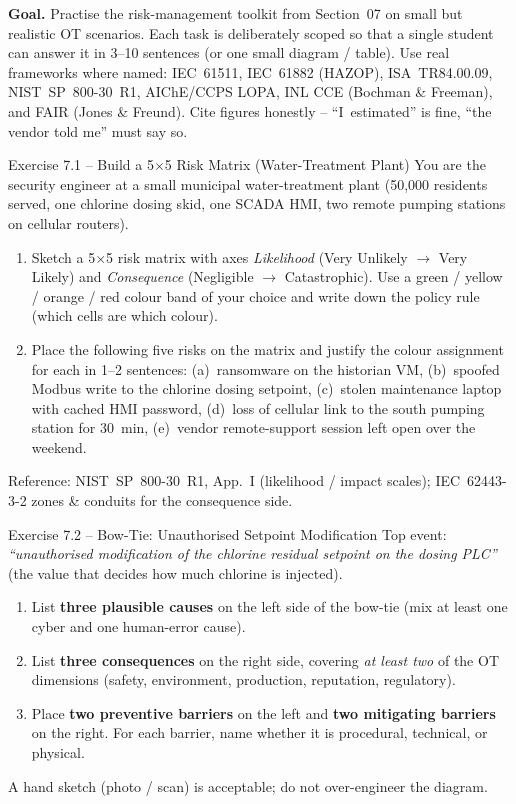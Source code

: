 \documentclass[11pt,a4paper]{article}
\begin{document}
\sheetheader

\noindent\textbf{Goal.} Practise the risk-management toolkit from Section~07 on small but
realistic OT scenarios. Each task is deliberately scoped so that a single
student can answer it in 3--10 sentences (or one small diagram / table).
Use real frameworks where named: IEC~61511, IEC~61882 (HAZOP),
ISA~TR84.00.09, NIST~SP~800-30~R1, AIChE/CCPS LOPA, INL CCE
(Bochman \& Freeman), and FAIR (Jones \& Freund). Cite figures honestly --
``I~estimated'' is fine, ``the vendor told me'' must say so.

\vspace{0.6em}

\begin{taskbox}{Exercise 7.1 -- Build a 5$\times$5 Risk Matrix (Water-Treatment Plant)}
You are the security engineer at a small municipal water-treatment plant
(50{,}000 residents served, one chlorine dosing skid, one SCADA HMI,
two remote pumping stations on cellular routers).
\begin{enumerate}
  \item Sketch a 5$\times$5 risk matrix with axes \emph{Likelihood}
        (Very Unlikely $\to$ Very Likely) and \emph{Consequence}
        (Negligible $\to$ Catastrophic). Use a green / yellow / orange / red
        colour band of your choice and write down the policy rule
        (which cells are which colour).
  \item Place the following five risks on the matrix and justify the colour
        assignment for each in 1--2 sentences:
        (a)~ransomware on the historian VM,
        (b)~spoofed Modbus write to the chlorine dosing setpoint,
        (c)~stolen maintenance laptop with cached HMI password,
        (d)~loss of cellular link to the south pumping station for 30~min,
        (e)~vendor remote-support session left open over the weekend.
\end{enumerate}
Reference: NIST~SP~800-30~R1, App.~I (likelihood / impact scales);
IEC~62443-3-2 zones \& conduits for the consequence side.
\end{taskbox}

\begin{taskbox}{Exercise 7.2 -- Bow-Tie: Unauthorised Setpoint Modification}
Top event: \emph{``unauthorised modification of the chlorine residual setpoint
on the dosing PLC''} (the value that decides how much chlorine is injected).
\begin{enumerate}
  \item List \textbf{three plausible causes} on the left side of the bow-tie
        (mix at least one cyber and one human-error cause).
  \item List \textbf{three consequences} on the right side, covering
        \emph{at least two} of the OT dimensions (safety, environment,
        production, reputation, regulatory).
  \item Place \textbf{two preventive barriers} on the left and
        \textbf{two mitigating barriers} on the right. For each barrier, name
        whether it is procedural, technical, or physical.
\end{enumerate}
A hand sketch (photo / scan) is acceptable; do not over-engineer the diagram.
\end{taskbox}
\end{document}
